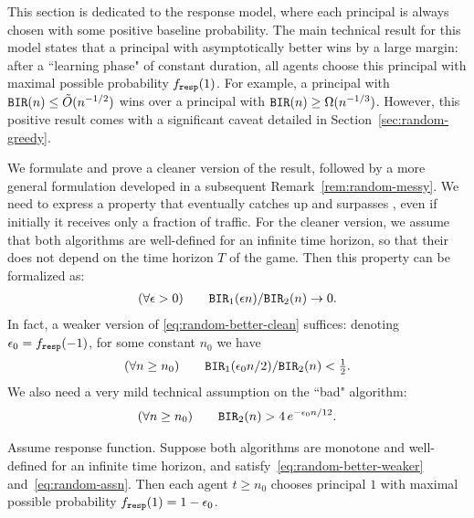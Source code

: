 This section is dedicated to the \HardMaxRandom response model, where each principal is always chosen with some positive baseline probability. The main technical result for this model states that a principal with asymptotically better \BIR wins by a large margin: after a ``learning phase" of constant duration, all agents choose this principal with maximal possible probability $f_{\mathtt{resp}}(1)$. For example, a principal with $\mathtt{BIR}(n)\leq \tilde{O}(n^{-1/2})$ wins over a principal with $\mathtt{BIR}(n)\geq \Omega(n^{-1/3})$. However, this positive result comes with a significant caveat detailed in Section~\ref{sec:random-greedy}.

We formulate and prove a cleaner version of the result, followed by a more general formulation developed in a subsequent Remark~\ref{rem:random-messy}. We need to express a property that \alg[1] eventually catches up and surpasses \alg[2], even if initially it receives only a fraction of traffic. For the cleaner version, we assume that both algorithms are well-defined for an infinite time horizon, so that their \BIR does not depend on the time horizon $T$ of the game.  Then this property can be formalized as:
\begin{align}\label{eq:random-better-clean}
(\forall \epsilon>0)\qquad
\mathtt{BIR}_1(\epsilon n)/\mathtt{BIR}_2(n) \to 0.
\end{align}
In fact, a weaker version of \eqref{eq:random-better-clean} suffices:
denoting $\epsilon_0 = f_{\mathtt{resp}}(-1)$, for some constant $n_0$ we have
\begin{align}\label{eq:random-better-weaker}
(\forall n\geq n_0) \qquad
\mathtt{BIR}_1(\epsilon_0 n/2)/\mathtt{BIR}_2(n) <\tfrac12.
\end{align}
We also need a very mild technical assumption on the ``bad" algorithm:
\begin{align}\label{eq:random-assn}
 (\forall n\geq n_0) \qquad
  \mathtt{BIR}_2(n) > 4\,e^{-\epsilon_0 n/12}.
\end{align}

\begin{theorem}\label{thm:random-clean}
Assume \HardMaxRandom response function. Suppose both algorithms are monotone and well-defined for an infinite time horizon, and satisfy~\eqref{eq:random-better-weaker} and~\eqref{eq:random-assn}. Then each agent $t\geq n_0$ chooses principal $1$ with maximal possible probability $f_{\mathtt{resp}}(1) = 1- \epsilon_0$.
\end{theorem}

